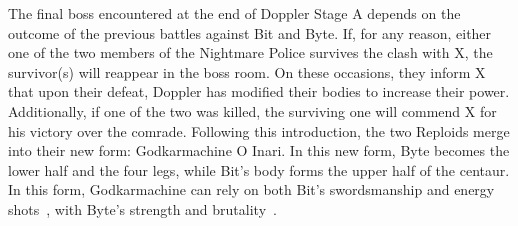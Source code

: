 The final boss encountered at the end of Doppler Stage A depends on the outcome of the previous battles against Bit and Byte. If, for any reason, either one of the two members of the Nightmare Police survives the clash with X, the survivor(s) will reappear in the boss room. On these occasions, they inform X that upon their defeat, Doppler has modified their bodies to increase their power. Additionally, if one of the two was killed, the surviving one will commend X for his victory over the	 comrade. Following this introduction, the two Reploids merge into their new form: Godkarmachine O Inari. In this new form, Byte becomes the lower half and the four legs, while Bit's body forms the upper half of the centaur. In this form, Godkarmachine can rely on both Bit's swordsmanship and energy shots~\cite{wayback:X3_resources}, with Byte's strength and brutality~\cite{wiki:Godkarmachine}.


